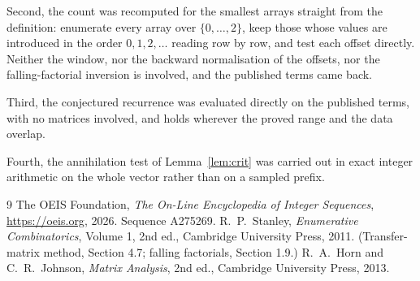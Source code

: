 \documentclass[11pt,a4paper]{article}
\theoremstyle{plain}
\theoremstyle{definition}
\begin{document}
Second, the count was recomputed for the smallest arrays straight from the definition:
enumerate every array over $\{0,\dots,2\}$, keep those whose values are introduced in the
order $0,1,2,\dots$ reading row by row, and test each offset directly. Neither the window, nor
the backward normalisation of the offsets, nor the falling-factorial inversion is involved, and
the published terms came back.

Third, the conjectured recurrence was evaluated directly on the published terms, with no
matrices involved, and holds wherever the proved range and the data overlap.

Fourth, the annihilation test of Lemma~\ref{lem:crit} was carried out in exact integer
arithmetic on the whole vector rather than on a sampled prefix.

\begin{thebibliography}{9}
 The OEIS Foundation, \emph{The On-Line Encyclopedia of Integer
Sequences}, \url{https://oeis.org}, 2026. Sequence A275269.
 R.~P.~Stanley, \emph{Enumerative Combinatorics}, Volume 1, 2nd ed.,
Cambridge University Press, 2011. (Transfer-matrix method, Section 4.7; falling factorials,
Section 1.9.)
 R.~A.~Horn and C.~R.~Johnson, \emph{Matrix Analysis}, 2nd ed., Cambridge
University Press, 2013.
\end{thebibliography}
\end{document}

